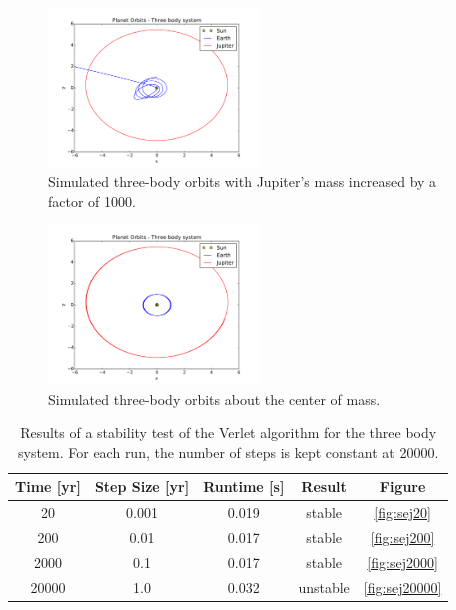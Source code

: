 \documentclass[10pt,showpacs,preprintnumbers,footinbib,amsmath,amssymb,aps,prl,twocolumn,groupedaddress,superscriptaddress,showkeys]{revtex4-1}
\begin{document}
\begin{figure}
\centering
	\includegraphics[width=0.5\textwidth]{figures/seJ1000.pdf}
	\caption{Simulated three-body orbits with Jupiter's mass increased by a
	factor of 1000.}
	\label{fig:seJ1000}
\end{figure}

\begin{figure}
\centering
	\includegraphics[width=0.5\textwidth]{figures/sejFinal.pdf}
	\caption{Simulated three-body orbits about the center of mass.}
	\label{fig:sejfinal}
\end{figure}

\begin{table}[h!]
\centering
	\begin{tabular}{ c c | c c c }
	Time [yr] & Step Size [yr] & Runtime [s] & Result & Figure\\
\hline
	20    & 0.001 & 0.019 & stable & \ref{fig:sej20}\\
	200   & 0.01 & 0.017 & stable & \ref{fig:sej200}\\
	2000 & 0.1 & 0.017 & stable & \ref{fig:sej2000}\\
	20000& 1.0& 0.032 & unstable & \ref{fig:sej20000}\\
\hline
	\end{tabular}
	\caption{Results of a stability test of the Verlet algorithm for the
	three body system. For each run, the number of steps is kept
	constant at 20000.}
	\label{tab:sejtest}
\end{table}
\end{document}
